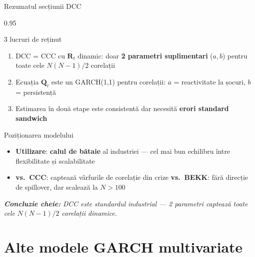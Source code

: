 \documentclass[9pt, aspectratio=169, t]{beamer}
\begin{document}
\begin{frame}{Rezumatul secțiunii DCC}
    \begin{cminipage}{0.95\textwidth}
    {\footnotesize
    \begin{block}{3 lucruri de reținut}
        \begin{enumerate}\setlength{\itemsep}{2pt}
            \item DCC = CCC cu $\mathbf{R}_t$ dinamic: doar \textbf{2 parametri suplimentari} ($a, b$) pentru toate cele $N(N-1)/2$ corelații
            \item Ecuația $\mathbf{Q}_t$ este un GARCH(1,1) pentru corelații: $a$ = reactivitate la șocuri, $b$ = persistență
            \item Estimarea în două etape este consistentă dar necesită \textbf{erori standard sandwich}
        \end{enumerate}
    \end{block}
    \begin{alertblock}{Poziționarea modelului}
        \begin{itemize}\setlength{\itemsep}{0pt}
            \item \textbf{Utilizare}: \textbf{calul de bătaie} al industriei --- cel mai bun echilibru între flexibilitate și scalabilitate
            \item \textbf{vs.\ CCC}: captează vârfurile de corelație din crize \quad \textbf{vs.\ BEKK}: fără direcție de spillover, dar scalează la $N > 100$
        \end{itemize}
    \end{alertblock}
    \vspace{1mm}
    \textit{\textbf{Concluzie cheie:} DCC este standardul industrial --- 2 parametri captează toate cele $N(N-1)/2$ corelații dinamice.}
    }
    \end{cminipage}
\end{frame}

\section{Alte modele GARCH multivariate}
\end{document}
